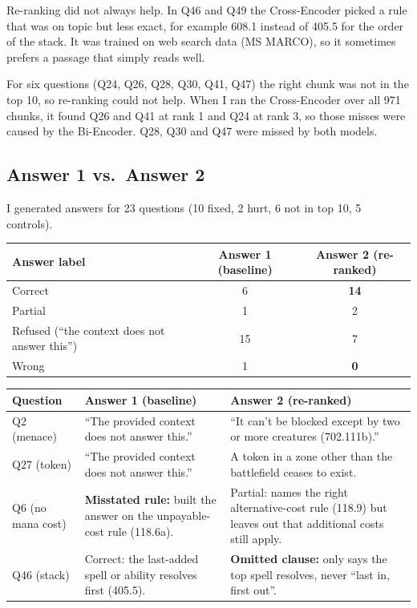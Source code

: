 \documentclass[11pt,a4paper]{article}
\begin{document}
Re-ranking did not always help. In Q46 and Q49 the Cross-Encoder picked a rule that was on topic but less exact, for example 608.1 instead of 405.5 for the order of the stack. It was trained on web search data (MS MARCO), so it sometimes prefers a passage that simply reads well.

For six questions (Q24, Q26, Q28, Q30, Q41, Q47) the right chunk was not in the top 10, so re-ranking could not help. When I ran the Cross-Encoder over all 971 chunks, it found Q26 and Q41 at rank 1 and Q24 at rank 3, so those misses were caused by the Bi-Encoder. Q28, Q30 and Q47 were missed by both models.

\subsection{Answer 1 vs.\ Answer 2}
I generated answers for 23 questions (10 fixed, 2 hurt, 6 not in top 10, 5 controls).

\begin{center}
\small
\begin{tabular}{lcc}
\toprule
Answer label & Answer 1 (baseline) & Answer 2 (re-ranked) \\
\midrule
Correct & 6 & \textbf{14} \\
Partial & 1 & 2 \\
Refused (``the context does not answer this'') & 15 & 7 \\
Wrong & 1 & \textbf{0} \\
\bottomrule
\end{tabular}
\end{center}

\begin{center}
\small
\begin{tabularx}{\linewidth}{p{2.3cm}LL}
\toprule
Question & Answer 1 (baseline) & Answer 2 (re-ranked) \\
\midrule
Q2 (menace) & ``The provided context does not answer this.'' & ``It can't be blocked except by two or more creatures (702.111b).'' \\
Q27 (token) & ``The provided context does not answer this.'' & A token in a zone other than the battlefield ceases to exist. \\
Q6 (no mana cost) & \textbf{Misstated rule:} built the answer on the unpayable-cost rule (118.6a). & Partial: names the right alternative-cost rule (118.9) but leaves out that additional costs still apply. \\
Q46 (stack) & Correct: the last-added spell or ability resolves first (405.5). & \textbf{Omitted clause:} only says the top spell resolves, never ``last in, first out''. \\
\bottomrule
\end{tabularx}
\end{center}
\end{document}
